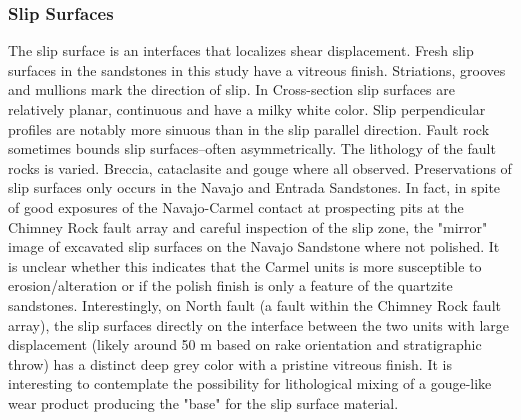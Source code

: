 \documentclass[12pt,a4paper]{article}
\begin{document}
{\begin{landscape}
    \end{landscape}
    \clearpage%


\subsubsection{Slip Surfaces}

The slip surface is an interfaces that localizes shear displacement. Fresh slip surfaces in the sandstones in this study have a vitreous finish. Striations, grooves and mullions mark the direction of slip. In Cross-section slip surfaces are relatively planar, continuous and have a milky white color. Slip perpendicular profiles are notably more sinuous than in the slip parallel direction. Fault rock sometimes bounds slip surfaces--often asymmetrically. The lithology of the fault rocks is varied. Breccia, cataclasite and gouge where all observed. Preservations of slip surfaces   only occurs in the Navajo and Entrada Sandstones. In fact, in spite of good exposures of the Navajo-Carmel contact at prospecting pits at the Chimney Rock fault array and careful inspection of the slip zone, the "mirror" image of excavated slip surfaces on the Navajo Sandstone where not polished. It is unclear whether this indicates that the Carmel units is more susceptible to erosion/alteration or if the polish finish is only a feature of the quartzite sandstones. Interestingly, on North fault (a fault within the Chimney Rock fault array), the slip surfaces directly on the interface between the two units with large displacement (likely around 50 m based on rake orientation and stratigraphic throw) has a distinct deep grey color with a pristine vitreous finish. It is interesting to contemplate the possibility for lithological mixing of a gouge-like wear product producing the "base" for the slip surface material.

}
\end{document}
